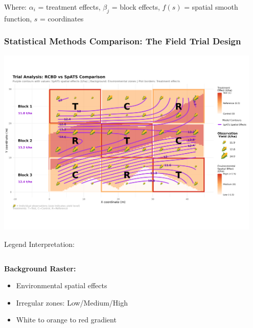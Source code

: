 \documentclass[aspectratio=43]{beamer}
\begin{document}
\begin{frame}
    \vspace{0.3cm}
    \begin{center}
        \small Where: $\alpha_i$ = treatment effects, $\beta_j$ = block effects, $f(s)$ = spatial smooth function, $s$ = coordinates
    \end{center}
\end{frame}

\begin{frame} %
    \frametitle{\small Statistical Methods Comparison: The Field Trial Design}
    
    \begin{center}
        \includegraphics[width=0.95\textwidth]{Imgs/integrated_rcbd_spats_comparison_irregular.png}
    \end{center}
    
    \begin{block}{\small Legend Interpretation:}
        \begin{columns}
            \begin{column}{0.33\textwidth}
                \textbf{Background Raster:}
                \begin{itemize}
                    \scriptsize
                    \item Environmental spatial effects
                    \item Irregular zones: Low/Medium/High
                    \item White to orange to red gradient
                \end{itemize}
            \end{column}
            

\end{columns}
\end{block}
\end{frame}
\end{document}

